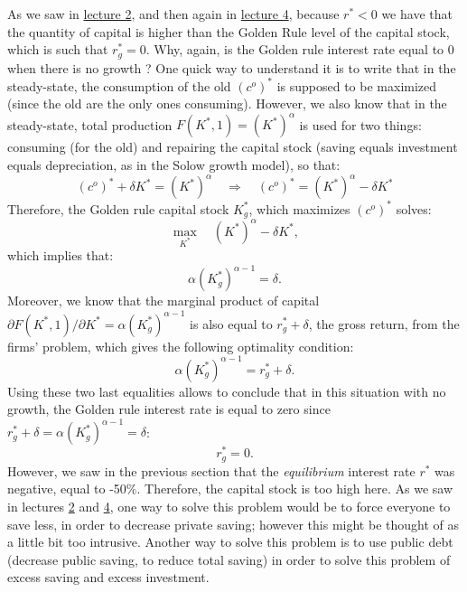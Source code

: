 \documentclass[]{book}
\theoremstyle{definition}
\theoremstyle{definition}
\theoremstyle{definition}
\theoremstyle{remark}
\begin{document}
As we saw in \protect\hyperlink{solow}{lecture 2}, and then again in
\protect\hyperlink{olg}{lecture 4}, because \(r^{*}<0\) we have that the
quantity of capital is higher than the Golden Rule level of the capital
stock, which is such that \(r^{*}_g=0\). Why, again, is the Golden rule
interest rate equal to 0 when there is no growth ? One quick way to
understand it is to write that in the steady-state, the consumption of
the old \((c^{o})^{*}\) is supposed to be maximized (since the old are
the only ones consuming). However, we also know that in the
steady-state, total production \(F(K^{*}, 1) = (K^{*})^{\alpha}\) is
used for two things: consuming (for the old) and repairing the capital
stock (saving equals investment equals depreciation, as in the Solow
growth model), so that:
\[(c^{o})^{*} + \delta K^{*} = (K^{*})^{\alpha} \quad \Rightarrow \quad (c^{o})^{*} = (K^{*})^{\alpha} -\delta K^{*} \]
Therefore, the Golden rule capital stock \(K^{*}_g\), which maximizes
\((c^{o})^{*}\) solves:
\[\max_{K^{*}}\quad (K^{*})^{\alpha}-\delta K^{*},\] which implies that:
\[\alpha (K^{*}_g)^{\alpha-1}=\delta.\] Moreover, we know that the
marginal product of capital
\(\partial F(K^{*}, 1)/\partial K^{*} = \alpha (K^{*}_g)^{\alpha-1}\) is
also equal to \(r^{*}_g+\delta\), the gross return, from the firms'
problem, which gives the following optimality condition:
\[\alpha (K^{*}_g)^{\alpha-1}=r^{*}_g+\delta.\] Using these two last
equalities allows to conclude that in this situation with no growth, the
Golden rule interest rate is equal to zero since
\(r^{*}_g+\delta = \alpha (K^{*}_g)^{\alpha-1} =\delta\): \[r^{*}_g=0.\]
However, we saw in the previous section that the \emph{equilibrium}
interest rate \(r^{*}\) was negative, equal to -50\%. Therefore, the
capital stock is too high here. As we saw in lectures
\protect\hyperlink{solow}{2} and \protect\hyperlink{olg}{4}, one way to
solve this problem would be to force everyone to save less, in order to
decrease private saving; however this might be thought of as a little
bit too intrusive. Another way to solve this problem is to use public
debt (decrease public saving, to reduce total saving) in order to solve
this problem of excess saving and excess investment.
\end{document}

